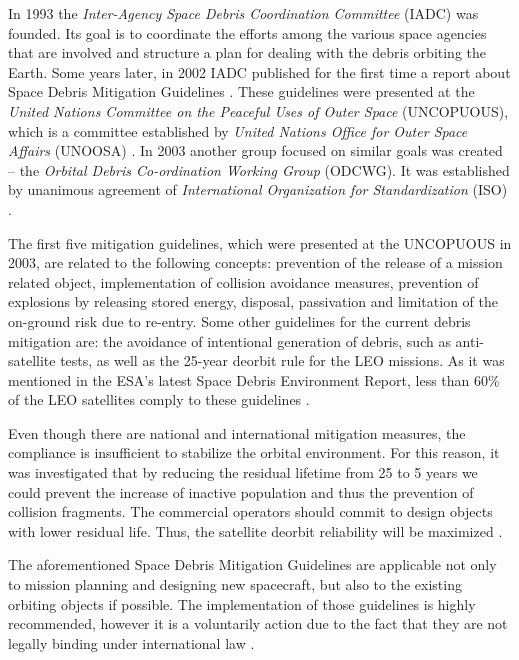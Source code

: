 In 1993 the \textit{Inter-Agency Space Debris Coordination Committee} (IADC) was founded. Its goal is to coordinate the efforts among the various space agencies that are involved and structure a plan for dealing with the debris orbiting the Earth. Some years later, in 2002 IADC published for the first time a report about Space Debris Mitigation Guidelines \cite{UNOOSA}. %
These guidelines were presented at the \textit{United Nations Committee on the Peaceful Uses of Outer Space} (UNCOPUOUS), which is a committee established by \textit{United Nations Office for Outer Space Affairs} (UNOOSA) \cite{IADC 2007}. In 2003 another group focused on similar goals was created – the \textit{Orbital Debris Co-ordination Working Group} (ODCWG). It was established by unanimous agreement of \textit{International Organization for Standardization} (ISO) \cite{Klinkrad 2006}.

The first five mitigation guidelines, which were presented at the UNCOPUOUS in 2003, are related to the following concepts: prevention of the release of a mission related object, implementation of collision avoidance measures, prevention of explosions by releasing stored energy, disposal, passivation and limitation of the on-ground risk due to re-entry. Some other guidelines for the current debris mitigation are: the avoidance of intentional generation of debris, such as anti-satellite tests, as well as the 25-year deorbit rule for the LEO missions. As it was mentioned in the ESA's latest Space Debris Environment Report, less than 60\% of the LEO satellites comply to these guidelines \cite{ESA 2020}. %

Even though there are national and international mitigation measures, the compliance is insufficient to stabilize the orbital environment. For this reason, it was investigated that by reducing the residual lifetime from 25 to 5 years we could prevent the increase of inactive population and thus the prevention of collision fragments. The commercial operators should commit to design objects with lower residual life. Thus, the satellite deorbit reliability will be maximized \cite{Somma 2019}.

The aforementioned Space Debris Mitigation Guidelines are applicable not only to mission planning and designing new spacecraft, but also to the existing orbiting objects if possible. The implementation of those guidelines is highly recommended, however it is a voluntarily action due to the fact that they are not legally binding under international law \cite{UNOOSA}.

